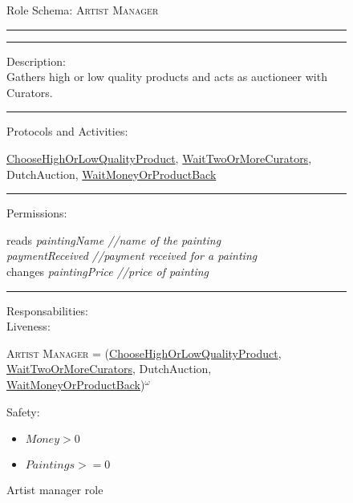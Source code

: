 \documentclass[a4paper,11pt]{report}
\begin{document}
  \begin{figure}[ht!]
    \begin{mdframed}
      Role Schema: \textsc{Artist Manager} \\ \hrule \vspace{2pt} \hrule \vspace{10pt}
      Description:\\
      Gathers high or low quality products and acts as auctioneer with Curators.
      \\ \hrule \vspace{10pt}
      Protocols and Activities:
      \vspace{-10pt}
      \begin{flushleft}
       \underline{ChooseHighOrLowQualityProduct}, \underline{WaitTwoOrMoreCurators}, DutchAuction, \underline{WaitMoneyOrProductBack}
      \end{flushleft}
      \hrule \vspace{10pt}
      Permissions:\\
      \vspace{-10pt}
      \begin{center}
       reads \textit{paintingName //name of the painting}\\
	    \textit{paymentReceived //payment received for a painting}\\
       changes \textit{paintingPrice //price of painting}
      \end{center}
      \hrule \vspace{10pt}
      Responsabilities:\\
      Liveness:
      \vspace{-10pt}
      \begin{flushleft}
      \small\textsc{Artist Manager} = (\underline{ChooseHighOrLowQualityProduct}, \underline{WaitTwoOrMoreCurators}, DutchAuction, \underline{WaitMoneyOrProductBack})$^\omega$
      \end{flushleft}
      Safety:
      \vspace{-10pt}
      \begin{itemize}
       \item $Money > 0$
       \item $Paintings >= 0$
      \end{itemize}
    \end{mdframed}
  \caption{Artist manager role}
  \label{figure:role_artist_manager}
  \end{figure}
  
\end{document}
